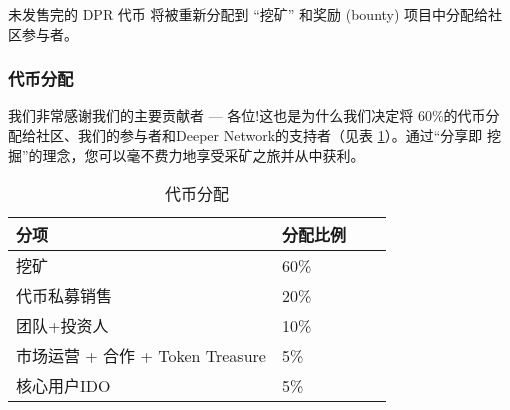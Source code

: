 \documentclass[a4paper]{article}
\begin{document}
\noindent 未发售完的 DPR 代币 将被重新分配到 “挖矿” 和奖励 (bounty) 项目中分配给社区参与者。

\subsubsection{代币分配}

我们非常感谢我们的主要贡献者 --- 各位!这也是为什么我们决定将 60\%的代币分配给社区、我们的参与者和Deeper Network的支持者（见表 \ref{tab:token-matrix}）。通过“分享即 挖掘”的理念，您可以毫不费力地享受采矿之旅并从中获利。

\begin{table} [hh]
\centering
\begin{tabular}{|l|l|l|p{9cm}|}
\hline
分项 & 分配比例 \\ \hline
挖矿 & 60\% \\ \hline
代币私募销售 & 20\% \\ \hline
团队+投资人 & 10\%	\\ \hline

市场运营 + 合作 + Token Treasure & 5\% \\ \hline
核心用户IDO & 5\% \\ \hline
\end{tabular}
\caption{代币分配} \label{tab:token-matrix}
\end{table}
\end{document}
